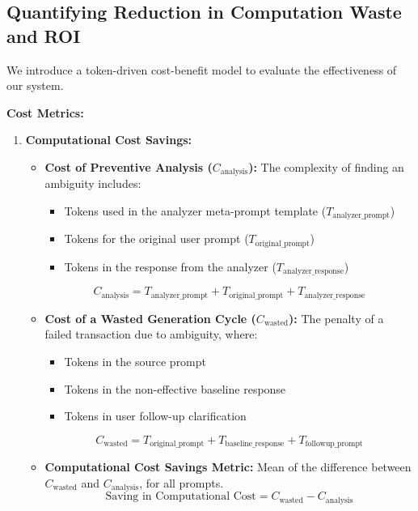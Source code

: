 \documentclass[conference]{IEEEtran}
\begin{document}
\subsection{Quantifying Reduction in Computation Waste and ROI}
We introduce a token-driven cost-benefit model to evaluate the effectiveness of our system.

\textbf{Cost Metrics:}
\begin{enumerate}
    \item \textbf{Computational Cost Savings:}
    \begin{itemize}
        \item \textbf{Cost of Preventive Analysis (\(C_{\text{analysis}}\)):}
            The complexity of finding an ambiguity includes:
        \begin{itemize}
            \item Tokens used in the analyzer meta-prompt template (\(T_{\text{analyzer\_prompt}}\))
            \item Tokens for the original user prompt (\(T_{\text{original\_prompt}}\))
            \item Tokens in the response from the analyzer (\(T_{\text{analyzer\_response}}\))
        \end{itemize}
        \begin{equation}
        C_{\text{analysis}} = T_{\text{analyzer\_prompt}} + T_{\text{original\_prompt}} + T_{\text{analyzer\_response}}
        \end{equation}
        
        \item \textbf{Cost of a Wasted Generation Cycle (\(C_{\text{wasted}}\)):}
        The penalty of a failed transaction due to ambiguity, where:
        \begin{itemize}
            \item Tokens in the source prompt
            \item Tokens in the non-effective baseline response
            \item Tokens in user follow-up clarification
        \end{itemize}
        \begin{equation}
        C_{\text{wasted}} = T_{\text{original\_prompt}} + T_{\text{baseline\_response}} + T_{\text{followup\_prompt}}
        \end{equation}
        
        \item \textbf{Computational Cost Savings Metric:}
        Mean of the difference between \(C_{\text{wasted}}\) and \(C_{\text{analysis}}\), for all prompts.
        \begin{equation}
        \text{Saving in Computational Cost} = C_{\text{wasted}} - C_{\text{analysis}}
        \end{equation}
    \end{itemize}
    

\end{enumerate}
\end{document}
